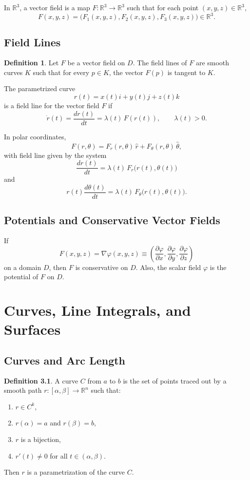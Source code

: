 \documentclass[11pt]{report}
\theoremstyle{definition}
\newtheorem{definition}{Definition}[chapter]
\theoremstyle{plain}
\theoremstyle{remark}
\newcommand{\R}{\mathbb{R}}
\newcommand{\grad}{\nabla}
\begin{document}
In $\R^3$, a vector field is a map $F:\R^3\to \R^3$ such that for each point $(x,y,z)\in \R^3$,
\[
F(x,y,z)=\bigl(F_1(x,y,z),F_2(x,y,z),F_3(x,y,z)\bigr)\in \R^3.
\]

\section{Field Lines}

\begin{definition}
Let $F$ be a vector field on $D$. The field lines of $F$ are smooth curves $K$ such that for every $p\in K$, the vector $F(p)$ is tangent to $K$.
\end{definition}

The parametrized curve
\[
r(t)=x(t)i+y(t)j+z(t)k
\]
is a field line for the vector field $F$ if
\[
\dot r(t)=\frac{dr(t)}{dt}=\lambda(t)\,F(r(t)),
\qquad \lambda(t)>0.
\]

In polar coordinates,
\[
F(r,\theta)=F_r(r,\theta)\,\hat r + F_\theta(r,\theta)\,\hat\theta,
\]
with field line given by the system
\[
\frac{dr(t)}{dt}=\lambda(t)\,F_r\bigl(r(t),\theta(t)\bigr)
\]
and
\[
r(t)\frac{d\theta(t)}{dt}=\lambda(t)\,F_\theta\bigl(r(t),\theta(t)\bigr).
\]

\section{Potentials and Conservative Vector Fields}

If
\[
F(x,y,z)=\grad\varphi(x,y,z)\equiv \left(\frac{\partial\varphi}{\partial x},\frac{\partial\varphi}{\partial y},\frac{\partial\varphi}{\partial z}\right)
\]
on a domain $D$, then $F$ is conservative on $D$. Also, the scalar field $\varphi$ is the potential of $F$ on $D$.

\chapter{Curves, Line Integrals, and Surfaces}

\section{Curves and Arc Length}

\begin{definition}
A curve $C$ from $a$ to $b$ is the set of points traced out by a smooth path $r:[\alpha,\beta]\to \R^n$ such that:
\begin{enumerate}
    \item $r\in C^{k}$,
    \item $r(\alpha)=a$ and $r(\beta)=b$,
    \item $r$ is a bijection,
    \item $r'(t)\neq 0$ for all $t\in(\alpha,\beta)$.
\end{enumerate}
Then $r$ is a parametrization of the curve $C$.
\end{definition}
\end{document}
